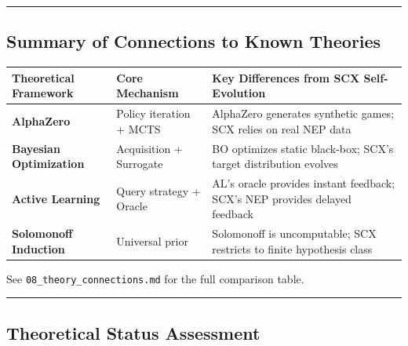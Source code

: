 \documentclass[
  12pt,
]{article}
\begin{document}
\begin{center}\rule{0.5\linewidth}{0.5pt}\end{center}

\subsection{Summary of Connections to Known Theories}\label{summary-of-connections-to-known-theories}

\begin{longtable}[]{@{}
  >{\raggedright\arraybackslash}p{}
  >{\raggedright\arraybackslash}p{}
  >{\raggedright\arraybackslash}p{}@{}}
\toprule\noalign{}
\begin{minipage}[b]{\linewidth}\raggedright
Theoretical Framework
\end{minipage} & \begin{minipage}[b]{\linewidth}\raggedright
Core Mechanism
\end{minipage} & \begin{minipage}[b]{\linewidth}\raggedright
Key Differences from SCX Self-Evolution
\end{minipage} \\
\midrule\noalign{}
\endhead
\bottomrule\noalign{}
\endlastfoot
\textbf{AlphaZero} & Policy iteration + MCTS & AlphaZero generates synthetic games; SCX relies on real NEP data \\
\textbf{Bayesian Optimization} & Acquisition + Surrogate & BO optimizes static black-box; SCX's target distribution evolves \\
\textbf{Active Learning} & Query strategy + Oracle & AL's oracle provides instant feedback; SCX's NEP provides delayed feedback \\
\textbf{Solomonoff Induction} & Universal prior & Solomonoff is uncomputable; SCX restricts to finite hypothesis class \\
\end{longtable}

See \texttt{08\_theory\_connections.md} for the full comparison table.

\begin{center}\rule{0.5\linewidth}{0.5pt}\end{center}

\subsection{Theoretical Status Assessment}\label{theoretical-status-assessment}
\end{document}
